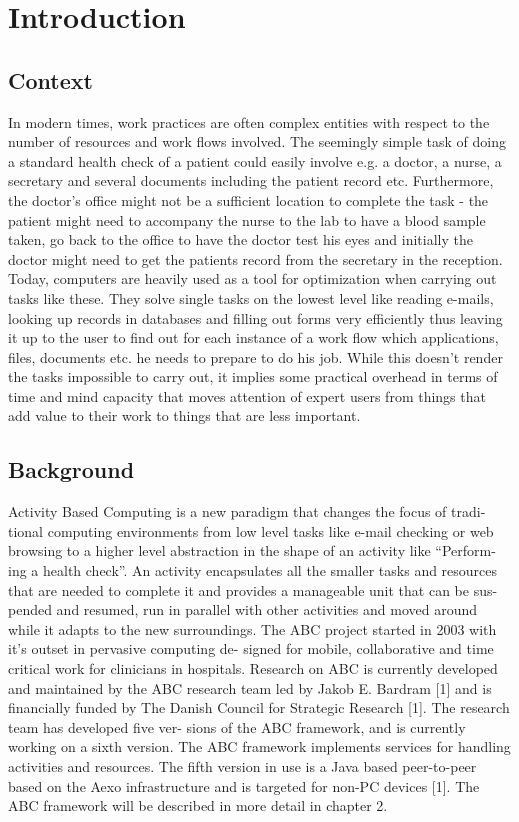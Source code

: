 \chapter{Introduction}

\section{Context}
In modern times, work practices are often complex entities with respect to the number of resources and work flows involved. The seemingly simple task of doing a standard health check of a patient could easily involve e.g. a doctor, a nurse, a secretary and several documents including the patient record etc. Furthermore, the doctor’s office might not be a sufficient location to complete the task - the patient might need to accompany the nurse to the lab to have a blood sample taken, go back to the office to have the doctor test his eyes and initially the doctor might need to get the patients record from the secretary in the reception.
Today, computers are heavily used as a tool for optimization when carrying out tasks like these. They solve single tasks on the lowest level like reading e-mails, looking up records in databases and filling out forms very efficiently thus leaving it up to the user to find out for each instance of a work flow which applications, files, documents etc. he needs to prepare to do his job. While this doesn’t render the tasks impossible to carry out, it implies some practical overhead in terms of time and mind capacity that moves attention of expert users from things that add value to their work to things that are less important.

\section{Background}
Activity Based Computing is a new paradigm that changes the focus of tradi- tional computing environments from low level tasks like e-mail checking or web browsing to a higher level abstraction in the shape of an activity like “Perform- ing a health check”. An activity encapsulates all the smaller tasks and resources that are needed to complete it and provides a manageable unit that can be sus- pended and resumed, run in parallel with other activities and moved around while it adapts to the new surroundings.
The ABC project started in 2003 with it’s outset in pervasive computing de- signed for mobile, collaborative and time critical work for clinicians in hospitals. Research on ABC is currently developed and maintained by the ABC research team led by Jakob E. Bardram [1] and is financially funded by The Danish Council for Strategic Research [1]. The research team has developed five ver- sions of the ABC framework, and is currently working on a sixth version. The ABC framework implements services for handling activities and resources. The fifth version in use is a Java based peer-to-peer based on the Aexo infrastructure and is targeted for non-PC devices [1]. The ABC framework will be described in more detail in chapter 2.


